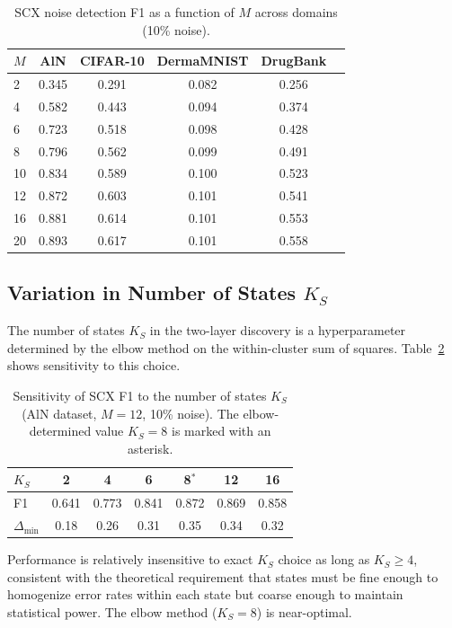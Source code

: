 \documentclass[11pt,a4paper]{article}
\begin{document}
\begin{table}[H]
\centering
\caption{SCX noise detection F1 as a function of $M$ across domains (10\% noise).}
\label{tab:S2_M_values}
\begin{tabular}{lccccc}
\toprule
$M$ & AlN & CIFAR-10 & DermaMNIST & DrugBank \\
\midrule
2 & 0.345 & 0.291 & 0.082 & 0.256 \\
4 & 0.582 & 0.443 & 0.094 & 0.374 \\
6 & 0.723 & 0.518 & 0.098 & 0.428 \\
8 & 0.796 & 0.562 & 0.099 & 0.491 \\
10 & 0.834 & 0.589 & 0.100 & 0.523 \\
12 & 0.872 & 0.603 & 0.101 & 0.541 \\
16 & 0.881 & 0.614 & 0.101 & 0.553 \\
20 & 0.893 & 0.617 & 0.101 & 0.558 \\
\bottomrule
\end{tabular}
\end{table}

\subsection{Variation in Number of States $K_S$}

The number of states $K_S$ in the two-layer discovery is a hyperparameter determined by the elbow method on the within-cluster sum of squares. Table~\ref{tab:S2_K} shows sensitivity to this choice.

\begin{table}[H]
\centering
\caption{Sensitivity of SCX F1 to the number of states $K_S$ (AlN dataset, $M = 12$, 10\% noise). The elbow-determined value $K_S = 8$ is marked with an asterisk.}
\label{tab:S2_K}
\begin{tabular}{lcccccc}
\toprule
$K_S$ & 2 & 4 & 6 & 8$^*$ & 12 & 16 \\
\midrule
F1 & 0.641 & 0.773 & 0.841 & 0.872 & 0.869 & 0.858 \\
$\Delta_{\min}$ & 0.18 & 0.26 & 0.31 & 0.35 & 0.34 & 0.32 \\
\bottomrule
\end{tabular}
\end{table}

Performance is relatively insensitive to exact $K_S$ choice as long as $K_S \geq 4$, consistent with the theoretical requirement that states must be fine enough to homogenize error rates within each state but coarse enough to maintain statistical power. The elbow method ($K_S = 8$) is near-optimal.
\end{document}
